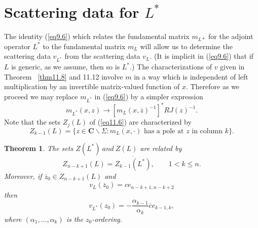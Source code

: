 \documentclass{surv-l}
\theoremstyle{plain}
\newtheorem{theorem}{Theorem}[section]
\theoremstyle{definition}
\numberwithin{equation}{chapter}
\begin{document}
\section{Scattering data for $L^{*}$}\label{sec15}
The identity (\ref{eq9.6}) which relates the fundamental matrix $m_{L*}$ for the adjoint operator $L^{*}$ to the fundamental matrix $m_{L}$ will allow us to determine the scattering data $v_{L^{*}}$ from the scattering data $v_{L}$. (It is implicit in (\ref{eq9.6}) that if $L$ is generic, as we assume, then so is $L^{*}.$) The characterizations of $v$ given in Theorem ~\ref{thm11.8} and 11.12 involve $m$ in a way which is independent of left multiplication by an invertible matrix-valued function of $x$. Therefore as we proceed we may replace $m_{L^{*}}$ in (\ref{eq9.6}) by a simpler expression
\setcounter{equation}{0}
\begin{equation}\label{eq15.1}
m_{L^{*}}(x, z)\rightarrow[m_{L}(x,\overline{z})^{-1}]^{*}RJ(z)^{-1}.
\end{equation}
Note that the sets $Z_{j}(L)$ of (\ref{eq11.6}) are characterized by
\begin{equation}\label{eq15.2}
Z_{k-1}(L)=\{z\in \mathbf{C}\backslash \Sigma : m_{L}(x,\cdot) \text{ has a pole at } z\text{ in column } k\}.
\end{equation}
\setcounter{theorem}{2}
\begin{theorem}\label{thm15.3}
The sets $Z(L^{*})\ and \ Z(L)$  are related by
\setcounter{equation}{3}
\begin{equation}\label{eq15.4}
Z_{n-k+1}(L)=\overline{Z_{k-1}(L^{*})},\qquad 1<k\leq n.
\end{equation}
Moreover, if $\overline{z}_{0}\in Z_{n-k+1}(L)$ and
\begin{equation}\label{eq15.5}
v_{L}(\overline{z}_{0})=ce_{n-k+1,n-k+2}
\end{equation}
then
\begin{equation}\label{eq15.6}
v_{L^{*}}(z_{0})=-\frac{\alpha_{k-1}}{\alpha_{k}}\overline{c}e_{k-1,k},
\end{equation}
where $(\alpha_{1},\ldots,\alpha_{k})$ is the $z_{0}$-ordering.
\end{theorem}
\end{document}
